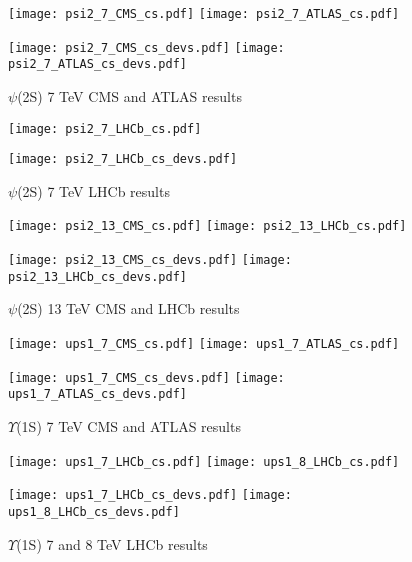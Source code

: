 \documentclass{article}
\begin{document}
\clearpage

\begin{figure}
\centering
\texttt{[image: psi2\_7\_CMS\_cs.pdf]}
\texttt{[image: psi2\_7\_ATLAS\_cs.pdf]}

\texttt{[image: psi2\_7\_CMS\_cs\_devs.pdf]}
\texttt{[image: psi2\_7\_ATLAS\_cs\_devs.pdf]}
\caption{$\psi$(2S) 7 TeV CMS and ATLAS results}
\end{figure}

\clearpage

\begin{figure}
\centering
\texttt{[image: psi2\_7\_LHCb\_cs.pdf]}

\texttt{[image: psi2\_7\_LHCb\_cs\_devs.pdf]}
\caption{$\psi$(2S) 7 TeV LHCb results}
\end{figure}

\clearpage

\begin{figure}
\centering
\texttt{[image: psi2\_13\_CMS\_cs.pdf]}
\texttt{[image: psi2\_13\_LHCb\_cs.pdf]}

\texttt{[image: psi2\_13\_CMS\_cs\_devs.pdf]}
\texttt{[image: psi2\_13\_LHCb\_cs\_devs.pdf]}
\caption{$\psi$(2S) 13 TeV CMS and LHCb results}
\end{figure}

\clearpage

\begin{figure}
\centering
\texttt{[image: ups1\_7\_CMS\_cs.pdf]}
\texttt{[image: ups1\_7\_ATLAS\_cs.pdf]}

\texttt{[image: ups1\_7\_CMS\_cs\_devs.pdf]}
\texttt{[image: ups1\_7\_ATLAS\_cs\_devs.pdf]}
\caption{$\Upsilon$(1S) 7 TeV CMS and ATLAS results}
\end{figure}

\clearpage

\begin{figure}
\centering
\texttt{[image: ups1\_7\_LHCb\_cs.pdf]}
\texttt{[image: ups1\_8\_LHCb\_cs.pdf]}

\texttt{[image: ups1\_7\_LHCb\_cs\_devs.pdf]}
\texttt{[image: ups1\_8\_LHCb\_cs\_devs.pdf]}
\caption{$\Upsilon$(1S) 7 and 8 TeV LHCb results}
\end{figure}
\end{document}
